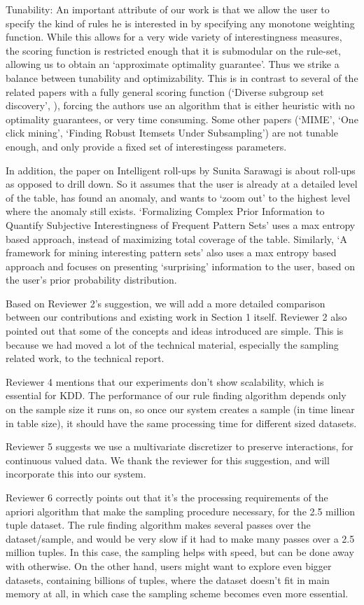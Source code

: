 \documentclass{article}
\begin{document}
Tunability: An important attribute of our work is that we allow the user to specify the kind of rules he is interested in by specifying any monotone weighting function. While this allows for a very wide variety of interestingness measures, the scoring function is restricted enough that it is submodular on the rule-set, allowing us to obtain an `approximate optimality guarantee'. Thus we strike a balance between tunability and optimizability. This is in contrast to several of the related papers with a fully general scoring function (`Diverse subgroup set discovery', ), forcing the authors use an algorithm that is either heuristic with no optimality guarantees, or very time consuming. Some other papers (`MIME', `One click mining', `Finding Robust Itemsets Under Subsampling') are not tunable enough, and only provide a fixed set of interestingess parameters. 

In addition, the paper on Intelligent roll-ups by Sunita Sarawagi is about roll-ups as opposed to drill down. So it assumes that the user is already at a detailed level of the table, has found an anomaly, and wants to `zoom out' to the highest level where the anomaly still exists. `Formalizing Complex Prior Information to Quantify Subjective Interestingness of Frequent Pattern Sets' uses a max entropy based approach, instead of maximizing total coverage of the table. Similarly, `A framework for mining interesting pattern sets' also uses a max entropy based approach and focuses on presenting `surprising' information to the user, based on the user's prior probability distribution.

Based on Reviewer 2's suggestion, we will add a more detailed comparison between our contributions and existing work in Section 1 itself. Reviewer 2 also pointed out that some of the concepts and ideas introduced are simple. This is because we had moved a lot of the technical material, especially the sampling related work, to the technical report.

Reviewer 4 mentions that our experiments don't show scalability, which is essential for KDD. The performance of our rule finding algorithm depends only on the sample size it runs on, so once our system creates a sample (in time linear in table size), it should have the same processing time for different sized datasets. 

Reviewer 5 suggests we use a multivariate discretizer to preserve interactions, for continuous valued data. We thank the reviewer for this suggestion, and will incorporate this into our system.

Reviewer 6 correctly points out that it's the processing requirements of the apriori algorithm that make the sampling procedure necessary, for the 2.5 million tuple dataset. The rule finding algorithm makes several passes over the dataset/sample, and would be very slow if it had to make many passes over a 2.5 million tuples. In this case, the sampling helps with speed, but can be done away with otherwise. On the other hand, users might want to explore even bigger datasets, containing billions of tuples, where the dataset doesn't fit in main memory at all, in which case the sampling scheme becomes even more essential. 

\end{document}
